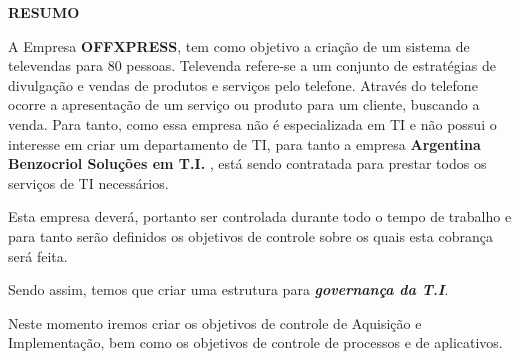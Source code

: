 \begin{center}
\textbf{RESUMO}
\end{center}
\singlespacing

\noindent A Empresa \textbf{OFFXPRESS}, tem como objetivo a criação de um sistema de televendas para 80 pessoas.
Televenda refere-se a um conjunto de estratégias de divulgação e vendas de produtos e serviços pelo telefone. 
Através do telefone ocorre a apresentação de um serviço ou produto para um cliente, buscando a venda. Para tanto, 
como essa empresa não é especializada em TI e não possui o interesse em criar um departamento de TI, para tanto a 
empresa \textbf{Argentina Benzocriol Soluções em T.I.} , está sendo contratada para prestar todos os serviços de TI 
necessários.

\noindent Esta empresa deverá, portanto ser controlada durante todo o tempo de trabalho e para tanto serão definidos
os objetivos de controle sobre os quais esta cobrança será feita. 

\noindent Sendo assim, temos que criar uma estrutura para \textbf{\textit{governança da T.I}}. 

\noindent Neste momento iremos criar os objetivos de controle de Aquisição e Implementação, 
bem como os objetivos de controle de processos e de aplicativos.